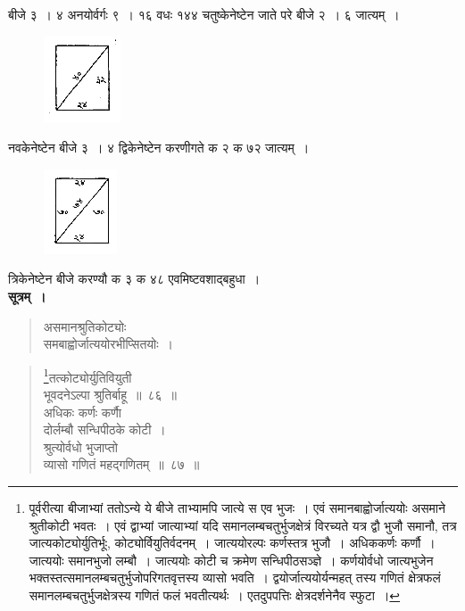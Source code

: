 \documentclass[11pt, openany]{book}
\begin{document}
बीजे ३~। ४ अनयोर्वर्गः ९~। १६ वधः १४४ चतुष्केनेष्टेन जाते परे बीजे २~। ६
जात्यम्~। 
\vspace{-2mm}

\begin{figure}[h!]
    \centering
    \includegraphics[scale=0.85]{graphics/capture104.png}
\end{figure}
\vspace{-2mm}

नवकेनेष्टेन बीजे ३~। ४ द्विकेनेष्टेन करणीगते क २ क ७२ जात्यम्~। 
\vspace{-2mm}

\begin{figure}[h!]
    \centering
    \includegraphics[scale=0.85]{graphics/capture105.png}
\end{figure}
\vspace{-2mm}

त्रिकेनेष्टेन बीजे करण्यौ क ३ क ४८ एवमिष्टवशाद्बहुधा~। \\

\textbf{सूत्रम्~।} 
 \label{4.86}
\begin{quote}
    \bs 
असमानश्रुतिकोट्योः \\
समबाह्वोर्जात्ययोरभीप्सितयोः~।
\end{quote}
\newpage%
\setcounter{footnote}{0}

\begin{quote}
    \bs 
 \footnote{पूर्वरीत्या बीजाभ्यां ततोऽन्ये ये बीजे ताभ्यामपि जात्ये स एव भुजः~। एवं समानबाह्वोर्जात्ययोः असमाने श्रुतीकोटी भवतः~। एवं द्वाभ्यां
जात्याभ्यां यदि समानलम्बचतुर्भुजक्षेत्रं विरच्यते यत्र द्वौ भुजौ समानौ,
तत्र जात्यकोट्योर्युतिर्भूः, कोट्योर्वियुतिर्वदनम्~। जात्ययोरल्पः
कर्णस्तत्र भुजौ~। अधिककर्णः कर्णौ~। जात्ययोः समानभुजो लम्बौ~। जात्ययोः
कोटी च क्रमेण सन्धिपीठसञ्ज्ञे~। कर्णयोर्वधो जात्यभुजेन
भक्तस्तत्समानलम्बचतुर्भुजोपरिगतवृत्तस्य व्यासो भवति~। 
द्वयोर्जात्ययोर्यन्महत् तस्य गणितं क्षेत्रफलं समानलम्बचतुर्भुजक्षेत्रस्य
गणितं फलं भवतीत्यर्थः~। एतदुपपत्तिः क्षेत्रदर्शनेनैव स्फुटा~। }तत्कोट्योर्युतिवियुती \\
भूवदनेऽल्पा श्रुतिर्बाहू~॥~८६~॥\\
अधिकः कर्णः कर्णाै \\
दोर्लम्बौ सन्धिपीठके कोटी~।\\
श्रुत्योर्वधो भुजाप्तो \\
व्यासो गणितं महद्गणितम्~॥~८७~॥
\end{quote}
\end{document}
